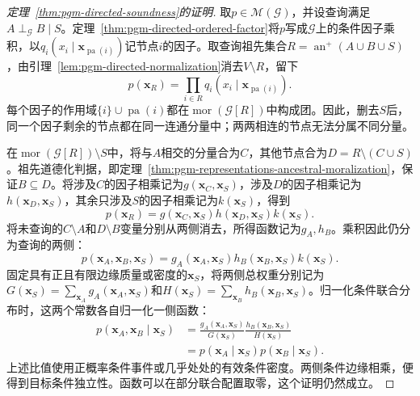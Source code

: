 \begin{proof}[定理~\ref{thm:pgm-directed-soundness}的证明]
取$p\in\mathcal{M}(\mathcal{G})$，并设查询满足$A\perp_{\mathcal{G}}B\mid S$。定理~\ref{thm:pgm-directed-ordered-factor}将$p$写成$\mathcal{G}$上的条件因子乘积，以$q_i(x_i\mid\bm{x}_{\operatorname{pa}(i)})$记节点$i$的因子。取查询祖先集合$R=\operatorname{an}^{+}(A\cup B\cup S)$，由引理~\ref{lem:pgm-directed-normalization}消去$V\setminus R$，留下
\[
  p(\bm{x}_R)=
  \prod_{i\in R}q_i(x_i\mid\bm{x}_{\operatorname{pa}(i)}).
\]
每个因子的作用域$\{i\}\cup\operatorname{pa}(i)$都在$\operatorname{mor}(\mathcal{G}[R])$中构成团。因此，删去$S$后，同一个因子剩余的节点都在同一连通分量中；两两相连的节点无法分属不同分量。

在$\operatorname{mor}(\mathcal{G}[R])\setminus S$中，将与$A$相交的分量合为$C$，其他节点合为$D=R\setminus(C\cup S)$。祖先道德化判据，即定理~\ref{thm:pgm-representations-ancestral-moralization}，保证$B\subseteq D$。将涉及$C$的因子相乘记为$g(\bm{x}_C,\bm{x}_S)$，涉及$D$的因子相乘记为$h(\bm{x}_D,\bm{x}_S)$，其余只涉及$S$的因子相乘记为$k(\bm{x}_S)$，得到
\[
  p(\bm{x}_R)=
  g(\bm{x}_C,\bm{x}_S)
  h(\bm{x}_D,\bm{x}_S)
  k(\bm{x}_S).
\]
将未查询的$C\setminus A$和$D\setminus B$变量分别从两侧消去，所得函数记为$g_A,h_B$。乘积因此仍分为查询的两侧：
\[
  p(\bm{x}_A,\bm{x}_B,\bm{x}_S)=
  g_A(\bm{x}_A,\bm{x}_S)
  h_B(\bm{x}_B,\bm{x}_S)
  k(\bm{x}_S).
\]
固定具有正且有限边缘质量或密度的$\bm{x}_S$，将两侧总权重分别记为$G(\bm{x}_S)=\sum_{\bm{x}_A}g_A(\bm{x}_A,\bm{x}_S)$和$H(\bm{x}_S)=\sum_{\bm{x}_B}h_B(\bm{x}_B,\bm{x}_S)$。归一化条件联合分布时，这两个常数各自归一化一侧函数：
\[
  \begin{aligned}
    p(\bm{x}_A,\bm{x}_B\mid\bm{x}_S)
      &=\frac{g_A(\bm{x}_A,\bm{x}_S)}{G(\bm{x}_S)}
        \frac{h_B(\bm{x}_B,\bm{x}_S)}{H(\bm{x}_S)}\\
      &=p(\bm{x}_A\mid\bm{x}_S)
        p(\bm{x}_B\mid\bm{x}_S).
  \end{aligned}
\]
上述比值使用正概率条件事件或几乎处处的有效条件密度。两侧条件边缘相乘，便得到目标条件独立性。函数可以在部分联合配置取零，这个证明仍然成立。
\end{proof}

